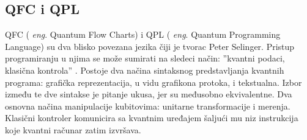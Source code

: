 \documentclass[a4paper]{article}
\begin{document}
{\subsection{QFC i QPL}
\label{sec:qfc_qml}

QFC ( \emph{eng}. Quantum Flow Charts) i QPL ( \emph{eng}. Quantum Programming Language) su dva blisko povezana jezika čiji je tvorac Peter Selinger.  Pristup programiranju u njima se može sumirati na sledeci način: ''kvantni podaci, klasična kontrola'' \cite[p. 1]{qfc}. Postoje dva načina sintaksnog predstavljanja kvantnih programa: grafička reprezentacija, u vidu grafikona protoka, i tekstualna. Izbor između te dve sintakse je pitanje ukusa, jer su međusobno ekvivalentne. \cite[p. 2]{qfc} Dva osnovna načina manipulacije kubitovima: unitarne transformacije i merenja. Klasični kontroler komunicira sa kvantnim uređajem šaljući mu niz instrukcija koje kvantni računar zatim izvršava. 

}
\end{document}
